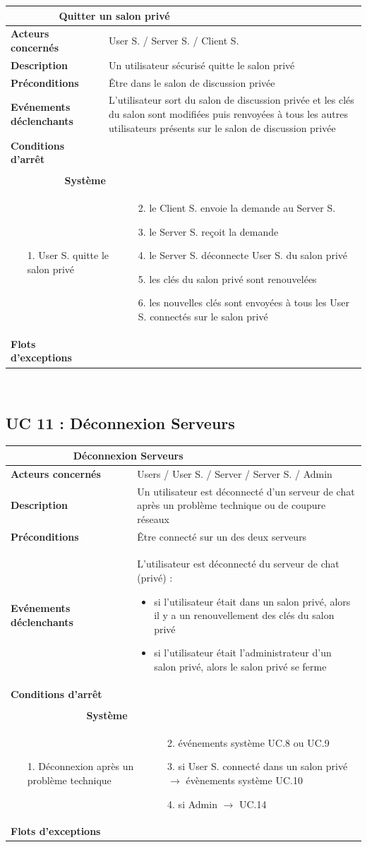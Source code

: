 \documentclass[a4paper,11pt,french]{article}
\newcommand{\fiche}[9] {
	\noindent
\begin{tabular}{|p{3.5cm}| p{1cm} | p{3cm} | p{.5cm} | p{7cm}|} 
\hline
\rowcolor{blue}
\multicolumn{2}{|l|}{\color{white}\bfseries{Nom}} & \multicolumn{3}{l|}{\color{white}\bfseries{#1}}\\
\hline
\multicolumn{2}{|l|}{\bfseries{Acteurs concernés}} & \multicolumn{3}{m{10.5cm}|}{#2}\\
\hline
\multicolumn{2}{|l|}{\bfseries{Description}} & \multicolumn{3}{m{10.5cm}|}{#3}\\
\hline
\multicolumn{2}{|l|}{\bfseries{Préconditions}} & \multicolumn{3}{m{10.5cm}|}{#4}\\
\hline
\multicolumn{2}{|l|}{\bfseries{Evénements déclenchants}} & \multicolumn{3}{m{10.5cm}|}{#5}\\
\hline
\multicolumn{2}{|l|}{\bfseries{Conditions d'arrêt}} & \multicolumn{3}{m{10.5cm}|}{#6}\\
\hline
\rowcolor{gray}
\multicolumn{5}{|c|}{\bfseries{Description du flot d'événements principal}}\\
\hline
\rowcolor{gray}
\multicolumn{3}{|c|}{\bfseries{Acteur(s)}} & \multicolumn{2}{c|}{\bfseries{Système}}\\
\hline
\multicolumn{3}{|p{7.5cm}|}{#7} & \multicolumn{2}{p{7.5cm}|}{#8}\\
\hline
\multicolumn{2}{|l}{\bfseries{Flots d'exceptions}} & \multicolumn{3}{|p{11.5cm}|}{#9}\\
\hline
\end{tabular}
\\
}
\begin{document}
\fiche
	{Quitter un salon privé} %
	{User S. / Server S. / Client S.} %
	{Un utilisateur sécurisé quitte le salon privé} %
	{Être dans le salon de discussion privée} %
	{L’utilisateur sort du salon de discussion privée et les clés du salon sont modifiées puis renvoyées à tous les autres utilisateurs présents sur le salon de discussion privée} %
	{} %
	{\begin{itemize}  %
		\item [1.] User S. quitte le salon privé
		\item[]  
	 \end{itemize}
	} 
	{\begin{itemize}  %
		\item []
		\item [2.] le Client S. envoie la demande au Server S.
		\item [3.] le Server S. reçoit la demande
		\item [4.] le Server S. déconnecte User S. du salon privé
		\item [5.] les clés du salon privé sont renouvelées
  		\item [6.] les nouvelles clés sont envoyées à tous les User S. connectés sur le salon privé
	 \end{itemize}
	 }
	{} %

\subsection{UC 11 : Déconnexion Serveurs}

\fiche
	{Déconnexion Serveurs} %
	{Users / User S. / Server / Server S. / Admin} %
	{Un utilisateur est déconnecté d’un serveur de chat après un problème technique ou de coupure réseaux} %
	{Être connecté sur un des deux serveurs} %
	{L’utilisateur est déconnecté du serveur de chat (privé) :
	\begin{itemize}
\item si l’utilisateur était dans un salon privé, alors il y a un renouvellement des clés du salon privé
\item si l’utilisateur était l’administrateur d’un salon privé, alors le salon privé se ferme
	\end{itemize}} %
	{} %
	{\begin{itemize}  %
		\item [1.] Déconnexion après un problème technique
		\item[]  
	 \end{itemize}
	} 
	{\begin{itemize}  %
		\item []
		\item [2.] événements système UC.8 ou UC.9
		\item [3.] si User S. connecté dans un salon privé $\rightarrow$ évènements système UC.10
		\item [4.] si Admin $\rightarrow$ UC.14
	 \end{itemize}
	 }
	{} %
\end{document}

